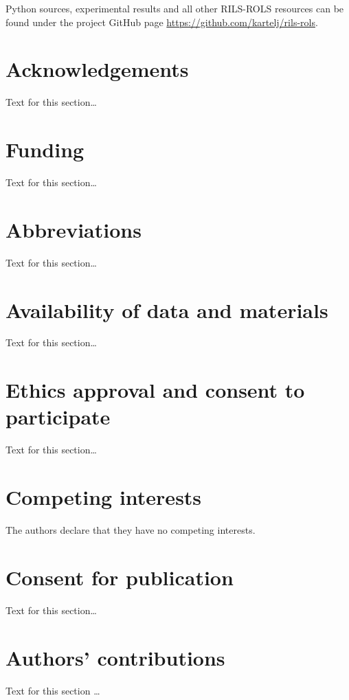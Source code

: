 \documentclass{bmcart}
\begin{document}
Python sources, experimental results and all other \textsc{RILS-ROLS} resources can be found under the project GitHub page \url{https://github.com/kartelj/rils-rols}. 
 


\begin{backmatter}

\section*{Acknowledgements}%
Text for this section\ldots

\section*{Funding}%
Text for this section\ldots

\section*{Abbreviations}%
Text for this section\ldots

\section*{Availability of data and materials}%
Text for this section\ldots

\section*{Ethics approval and consent to participate}%
Text for this section\ldots

\section*{Competing interests}
The authors declare that they have no competing interests.

\section*{Consent for publication}%
Text for this section\ldots

\section*{Authors' contributions}
Text for this section \ldots


\end{backmatter}
\end{document}
